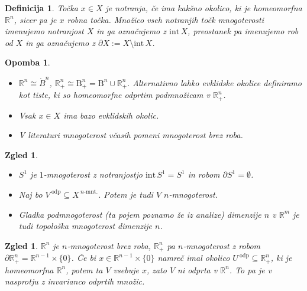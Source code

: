 \documentclass[10pt, a4paper]{article}
\newtheorem{defi}[izr]{Definicija}
\newenvironment{noticeB}{%
  \tcolorbox[%
  notitle,
  empty,
  enhanced,  %
  breakable,
  coltext=black,
  colback=white, 
  fontupper=\rmfamily,
  noparskip,
  sharp corners,
  boxrule=-1pt,  %
  frame hidden,
  left=7pt,  %
  right=7pt,
  top=5pt,
  bottom=5pt,
  before skip=2.5ex plus 2pt,
  after skip=2.5ex plus 2pt,
  borderline west = {1.5pt}{-0.1pt}{blue!30!black}, %
  overlay unbroken and last={%
    \draw[color=black, line width=1.25pt]
    ($(frame.south west)+(1.pt, -0.1pt)$) -- ++(2em, 0);
  }
  ]}
{\endtcolorbox}
\newenvironment{definicija}{\begin{noticeB}\begin{defi}}{%
\end{defi}\end{noticeB}}
\newtheorem*{opomba}{Opomba}
\newtheorem{zgled}[izr]{Zgled}
\newcommand{\R}{\mathbb {R}}
\newcommand{\intem}{\mathrm{int}\,}
\begin{document}
\begin{definicija}
  Točka $x \in X$ je notranja, če ima kakšno okolico, ki je homeomorfna $\R^n$,
  sicer pa je $x$ robna točka. Množico vseh notranjih točk mnogoterosti 
  imenujemo notranjost $X$ in ga označujemo z $\intem X$, preostanek pa imenujemo rob od $X$
  in ga označujemo z $\partial X := X \setminus \intem X$. 
\end{definicija}

\begin{opomba}
  \begin{itemize}
    \item $\R^n \cong \mathring{B}^n$, $\R^n_+ \cong \mathrm{B}^n_+ = \mathrm{B}^n \cup \R^n _+.$
    Alternativno lahko evklidske okolice definiramo kot tiste, ki so homeomorfne odprtim podmnožicam v $\R^n_+$.
    \item Vsak $x \in X$ ima bazo evklidskih okolic.
    \item V literaturi mnogoterost včasih pomeni mnogoterost brez roba.
  \end{itemize}
\end{opomba}

\begin{zgled}
  \begin{itemize}
    \item $S^1$ je $1$-mnogoterost z notranjostjo $\intem S^1 = S^1$ in robom $\partial S^1 = \emptyset$.
    \item Naj bo $V^{\ \text{odp}} \subseteq X^{\ \text{$n$-mnt.}}$. Potem je tudi $V$ $n$-mnogoterost.
    \item Gladka podmnogoterost (ta pojem poznamo že iz analize) dimenzije $n$ v $\R^m$ je tudi topološka 
    mnogoterost dimenzije $n$.
  \end{itemize}
\end{zgled}

\begin{zgled}
$\R^n$ je $n$-mnogoterost brez roba, $\R^n_+$ pa $n$-mnogoterost z robom $\partial \R^n_+ = \R^{n - 1} \times \{0\}$.
    Če bi $x \in \R^{n - 1} \times \{0\}$ namreč imal okolico $U^{\ \text{odp}}\subseteq \R^n_+$, ki je homeomorfna $\R^n$,
    potem ta $V$ vsebuje $x$, zato $V$ ni odprta v $\R^n$. To pa je v nasprotju z invarianco odprtih množic.  
\end{zgled}
  
\end{document}

